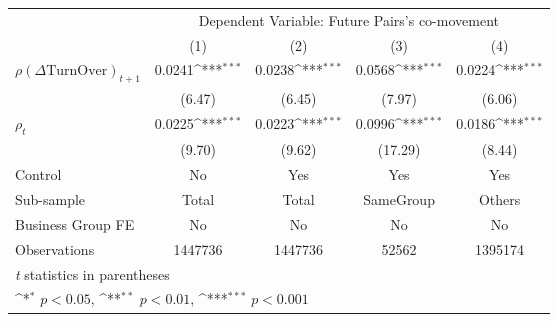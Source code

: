 {
\def\sym#1{\ifmmode^{#1}\else\(^{#1}\)\fi}
\begin{tabular}{l*{4}{c}}
\hline\hline
                &\multicolumn{4}{c}{Dependent Variable: Future Pairs's co-movement}         \\\cmidrule(lr){2-5}
                &\multicolumn{1}{c}{(1)}         &\multicolumn{1}{c}{(2)}         &\multicolumn{1}{c}{(3)}         &\multicolumn{1}{c}{(4)}         \\
\hline
 $ {\rho(\Delta \text{TurnOver})_{t+1}} $ &   0.0241\sym{***}&   0.0238\sym{***}&   0.0568\sym{***}&   0.0224\sym{***}\\
                &   (6.47)         &   (6.45)         &   (7.97)         &   (6.06)         \\
[1em]
 $ {\rho_t} $   &   0.0225\sym{***}&   0.0223\sym{***}&   0.0996\sym{***}&   0.0186\sym{***}\\
                &   (9.70)         &   (9.62)         &  (17.29)         &   (8.44)         \\
\hline
Control         &       No         &      Yes         &      Yes         &      Yes         \\
Sub-sample      &    Total         &    Total         &SameGroup         &   Others         \\
Business Group FE&       No         &       No         &       No         &       No         \\
Observations    &  1447736         &  1447736         &    52562         &  1395174         \\
\hline\hline
\multicolumn{5}{l}{\footnotesize \textit{t} statistics in parentheses}\\
\multicolumn{5}{l}{\footnotesize \sym{*} \(p<0.05\), \sym{**} \(p<0.01\), \sym{***} \(p<0.001\)}\\
\end{tabular}
}
